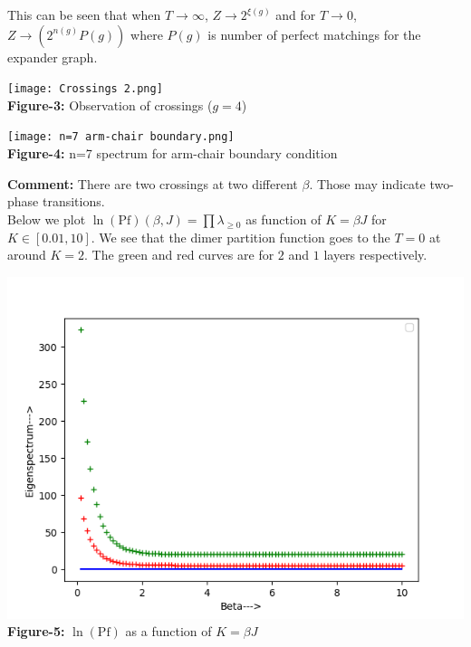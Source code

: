 \documentclass{article}
\begin{document}
	This can be seen that when $T \to \infty$, $Z \to 2^{\xi(g)}$ and for $T \to 0$, $Z \to (2^{n(g)}P(g))$ where $P(g)$ is number of perfect matchings for the expander graph.\\
	
	
	\begin{center}
		\texttt{[image: Crossings 2.png]}\\
		\textbf{Figure-3:} Observation of crossings ($g=4$)\\
	\end{center}
	
	\begin{center}
		\texttt{[image: n=7 arm-chair boundary.png]}\\
		\textbf{Figure-4:} n=7 spectrum for arm-chair boundary condition\\
	\end{center}
	
	\vspace{0.2 cm}
	\textbf{Comment:} There are two crossings at two different $\beta$. Those may indicate two-phase transitions.\\
	
	Below we plot $\ln (\text{Pf})(\beta, J)=\prod \lambda_{\geq 0}$ as function of $K=\beta J$ for $K \in [0.01,10]$. We see that the dimer partition function goes to the $T=0$ at around $K=2$. The green and red curves are for $2$ and $1$ layers respectively.\\
	\begin{center}
		\includegraphics[scale=0.5]{Log Pfaffian.png}\\
		\textbf{Figure-5:} $\ln(\text{Pf})$ as a function of $K=\beta J$\\
	\end{center}
	
\end{document}
